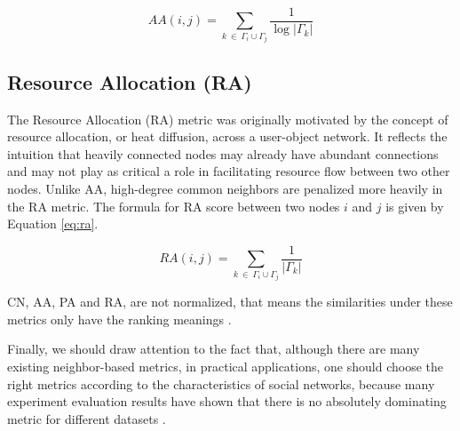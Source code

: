\begin{equation}
\label{eq:aa}
  AA(i, j) = \sum_{k\ \in\ \Gamma_i \cup \Gamma_j} \frac{1}{\log{|\Gamma_k|}}
\end{equation}




\subsection{Resource Allocation (RA)}

The Resource Allocation (RA) \cite{zhou2010solving} metric was originally motivated by the concept of resource allocation, or heat diffusion, across a user-object network. It reflects the intuition that heavily connected nodes may already have abundant connections and may not play as critical a role in facilitating resource flow between two other nodes. Unlike AA, high-degree common neighbors are penalized more heavily in the RA metric. The formula for RA score between two nodes $i$ and $j$ is given by Equation \ref{eq:ra}.

\begin{equation}
\label{eq:ra}
  RA(i, j) = \sum_{k\ \in\ \Gamma_i \cup \Gamma_j} \frac{1}{|\Gamma_k|}
\end{equation}

CN, AA, PA and RA, are not normalized, that means the similarities under these metrics only have the ranking meanings \cite{wang2014link}.

Finally, we should draw attention to the fact that, although there are many existing neighbor-based metrics, in practical applications, one should choose the right metrics according to the characteristics of social networks, because many experiment evaluation results have shown that there is no absolutely dominating metric for different datasets \cite{liben2003link, wang2014link}.
